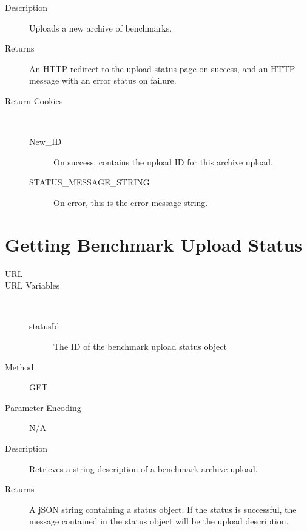 \begin{description}
\begin{description}
	\end{description}
\item [Description] Uploads a new archive of benchmarks.
\item [Returns] An HTTP redirect to the upload status page on success, and an HTTP message with an error status on
failure.
\item [Return Cookies] \
	\begin{description}
	\item [New\_ID]  On success, contains the upload ID for this archive upload.
	\item [STATUS\_MESSAGE\_STRING] \type{String} On error, this is the error message string.
	\end{description}
\end{description}


\section{Getting Benchmark Upload Status}
\begin{description}
\item [URL] 
\item [URL Variables] \
	\begin{description}
	\item[statusId]  The ID of the benchmark upload status object
	\end{description}
\item [Method] GET
\item [Parameter Encoding] N/A
\item [Description] Retrieves a string description of a benchmark archive upload.
\item [Returns] A jSON string containing a status object. If the status is successful, the message contained in the status object will be the upload description.
\end{description}


